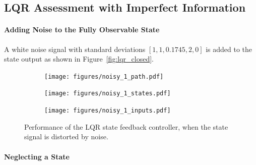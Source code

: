 \subsection{LQR Assessment with Imperfect Information}

\paragraph{Adding Noise to the Fully Observable State} A white noise signal with standard deviations $\left[1, 1, 0.1745, 2, 0\right]$ is added to the state output as shown in Figure~\ref{fig:lqr_closed}.


\begin{figure}[h]
	\centering
	\begin{subfigure}{0.6\textwidth}
	\texttt{[image: figures/noisy\_1\_path.pdf]}
	\end{subfigure}
	\begin{subfigure}{0.49\textwidth}
	\texttt{[image: figures/noisy\_1\_states.pdf]}
	\end{subfigure}
	\begin{subfigure}{0.39\textwidth}
	\texttt{[image: figures/noisy\_1\_inputs.pdf]}
	\end{subfigure}
	\caption{Performance of the LQR state feedback controller, when the state signal is distorted by noise.}
	\label{fig:noisy_states}
\end{figure}

\paragraph{Neglecting a State}

